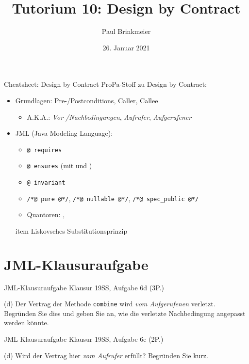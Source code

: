 \documentclass{beamer}
\title{Tutorium 10: Design by Contract}
\author{Paul Brinkmeier}
\institute{Tutorium Programmierparadigmen am KIT}
\date{26. Januar 2021}
\begin{document}
\begin{frame}
	\titlepage
\end{frame}

\begin{frame}{Cheatsheet: Design by Contract}
	ProPa-Stoff zu Design by Contract:

	\begin{itemize}
		\item Grundlagen: Pre-/Postconditions, Caller, Callee
		\begin{itemize}
                  \item A.K.A.: \emph{Vor-/Nachbedingungen}, \emph{Aufrufer}, \emph{Aufgerufener}
		\end{itemize}
		\item JML (Java Modeling Language):
		\begin{itemize}
			\item \texttt{@ requires}
			\item \texttt{@ ensures} (mit \texttt{\string\old} und \texttt{\string\result})
			\item \texttt{@ invariant}
			\item \texttt{/*@ pure @*/}, \texttt{/*@ nullable @*/}, \texttt{/*@ spec\_public @*/}
			\item Quantoren: \texttt{\string\forall}, \texttt{\string\exists}
                \end{itemize}
                item Liskovsches Substitutionsprinzip
	\end{itemize}
\end{frame}

\section{JML-Klausuraufgabe}

\begin{frame}{JML-Klausuraufgabe}
    Klausur 19SS, Aufgabe 6d (3P.)

    {
    \footnotesize

    (d) Der Vertrag der Methode \texttt{combine} wird \emph{vom Aufgerufenen} verletzt.
    Begründen Sie dies und geben Sie an, wie die verletzte Nachbedingung angepasst werden könnte.
    }
\end{frame}

\begin{frame}{JML-Klausuraufgabe}
    Klausur 19SS, Aufgabe 6e (2P.)

    {
    \footnotesize

    (d) Wird der Vertrag hier \emph{vom Aufrufer} erfüllt?
    Begründen Sie kurz.
    }
\end{frame}
\end{document}
